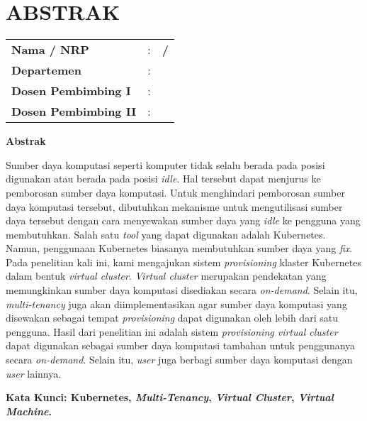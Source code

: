\chapter*{ABSTRAK}


\vspace{2ex}

\begin{center}
  \large\textbf{\tatitle{}}
\end{center}

\vspace{2ex}

\begingroup
\setlength{\tabcolsep}{0pt}

\noindent
\begin{tabularx}{\textwidth}{l >{\centering}m{2em} X}
  \textbf{Nama / NRP}           & : & \textbf{\name{} / \nrp{}} \\
  \textbf{Departemen}           & : & \textbf{\department{}}    \\
  \textbf{Dosen Pembimbing I}   & : & \textbf{\advisor{}}       \\
  \textbf{Dosen Pembimbing II}  & : & \textbf{\coadvisor{}}     \\
\end{tabularx}
\endgroup

\noindent
\textbf{Abstrak}

Sumber daya komputasi seperti komputer tidak selalu berada
pada posisi digunakan atau berada pada posisi \emph{idle}.
Hal tersebut dapat menjurus ke pemborosan sumber daya komputasi.
Untuk menghindari pemborosan sumber daya komputasi tersebut,
dibutuhkan mekanisme untuk mengutilisasi sumber daya tersebut dengan cara
menyewakan sumber daya yang \emph{idle} ke pengguna yang membutuhkan. Salah satu \emph{tool} yang
dapat digunakan adalah Kubernetes. Namun, penggunaan Kubernetes
biasanya membutuhkan sumber daya yang \emph{fix}. Pada
penelitian kali ini, kami mengajukan sistem \emph{provisioning}
klaster Kubernetes dalam bentuk \emph{virtual cluster}. \emph{Virtual cluster}
merupakan pendekatan yang memungkinkan sumber daya komputasi disediakan secara
\emph{on-demand}. Selain itu, \emph{multi-tenancy} juga akan diimplementasikan
agar sumber daya komputasi yang disewakan sebagai tempat \emph{provisioning} dapat digunakan
oleh lebih dari satu pengguna. Hasil dari penelitian ini
adalah sistem \emph{provisioning virtual cluster} dapat digunakan sebagai
sumber daya komputasi tambahan untuk penggunanya secara \emph{on-demand}. Selain itu,
\emph{user} juga berbagi sumber daya komputasi dengan \emph{user} lainnya.

\vspace{2ex}
\noindent
\textbf{Kata Kunci: Kubernetes, \emph{Multi-Tenancy}, \emph{Virtual Cluster}, \emph{Virtual Machine}.}
